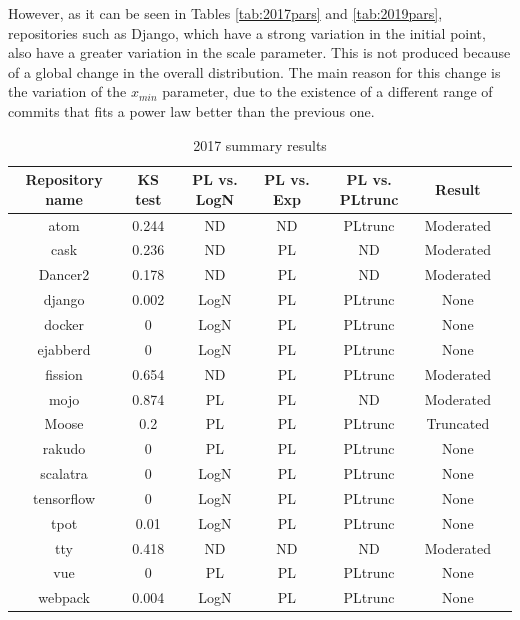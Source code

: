 \documentclass{article}
\begin{document}
However, as it can be seen in Tables \ref{tab:2017pars} and
\ref{tab:2019pars}, repositories such as Django, which have a strong
variation in the initial point, also have a greater variation in the
scale parameter. This is not produced because of a global change in the overall
distribution. The main reason for this change is the variation of the $x_{min}$ parameter, due to the existence of a different range of commits that fits a power law better than the previous one. %
%
\begin{table}[h!tbp]
  \caption{2017 summary results}
  \begin{center}
    \begin{tabular}{| c |c| c | c| c |c | c |}
      \hline
      Repository name & KS test & PL vs. LogN & PL vs. Exp & PL vs. PLtrunc & Result \\ 
      \hline
      atom & 0.244 &ND & ND &PLtrunc & Moderated \\ 
      cask & 0.236 &ND & PL & ND & Moderated \\
      Dancer2 &0.178 &ND &PL &ND & Moderated \\
      django &0.002 &LogN &PL &PLtrunc &None\\
      docker &0 &LogN &PL &PLtrunc &None\\
      ejabberd &0 &LogN &PL &PLtrunc &None\\
      fission &0.654 &ND &PL &PLtrunc & Moderated\\
      mojo &0.874 &PL &PL &ND & Moderated \\
      Moose &0.2 &PL &PL &PLtrunc & Truncated\\
      rakudo &0 &PL &PL &PLtrunc & None\\
      scalatra &0 &LogN &PL &PLtrunc & None\\
      tensorflow &0 &LogN &PL &PLtrunc & None\\
      tpot &0.01 &LogN &PL &PLtrunc &None\\
      tty &0.418 &ND &ND &ND & Moderated \\
      vue &0 &PL &PL &PLtrunc & None\\
      webpack &0.004 &LogN &PL & PLtrunc & None\\
      \hline
    \end{tabular}
  \end{center}
  \label{tab:2017tests}
\end{table}
\end{document}
